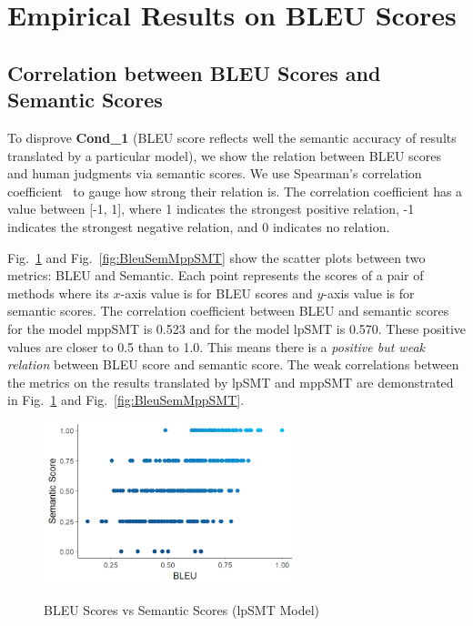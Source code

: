 \section{Empirical Results on BLEU Scores}
\label{sec:bleuresult}


\subsection{Correlation between BLEU Scores and Semantic Scores}


To disprove {\bf Cond\_1} (BLEU score reflects well the semantic
accuracy of results translated by a particular model), we show the
relation between BLEU scores and human judgments via semantic scores.
We use Spearman's correlation coefficient~\cite{geek_2015} to gauge how
strong their relation is. The correlation coefficient has a value
between [-1, 1], where 1 indicates the strongest positive relation, -1
indicates the strongest negative relation, and 0 indicates no
relation.

Fig.~\ref{fig:BleuSemlpSMT} and Fig.~\ref{fig:BleuSemMppSMT} show the
scatter plots between two metrics: BLEU and Semantic. Each point
represents the scores of a pair of methods where its $x$-axis value is
for BLEU scores and $y$-axis value is for semantic scores. The
correlation coefficient between BLEU and semantic scores for the model
mppSMT is 0.523 and for the model lpSMT is 0.570. These positive values
are closer to 0.5 than to 1.0. This means there is a {\em positive but weak
relation} between BLEU score and semantic score. The weak correlations %
between the metrics on the results translated by lpSMT and mppSMT are
demonstrated in Fig.~\ref{fig:BleuSemlpSMT} and Fig.~\ref{fig:BleuSemMppSMT}.



\begin{figure}
\caption{BLEU Scores vs Semantic Scores (lpSMT Model)}
\centering
\includegraphics[width=2.9in]{img/bleuvssemantic_lpSMT.png}
\label{fig:BleuSemlpSMT}
\end{figure}

